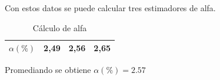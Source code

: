 Con estos datos se puede calcular tres estimadores de alfa.

\begin{table}[htb]

\centering
\caption{Cálculo de alfa}

\label{tabla:alfa2}
\begin{tabular}{|l|l|l|l|}
\hline
$\alpha (\%)$ &2,49 & 2,56 &2,65\\ \hline

\end{tabular}

\end{table}

Promediando se obtiene $\alpha(\%)=2.57$